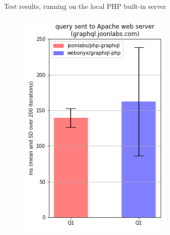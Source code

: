 \documentclass[11pt, a4paper]{article}
\begin{document}
\begin{figure}
\begin{subfigure}{.5\textwidth}
  \label{localhost_Q4}
\end{subfigure}%
\caption{Test results, running on the local PHP built-in server}
\label{figure1}
\end{figure}


\begin{figure}
\centering
\begin{subfigure}{.5\textwidth}
  \centering
  \includegraphics[width=.75\linewidth]{results/joonlabs_Q1.png}
  \label{localhost_Q1}
\end{subfigure}%
\begin{subfigure}{.5\textwidth}
  \centering

\end{subfigure}
\end{figure}
\end{document}
